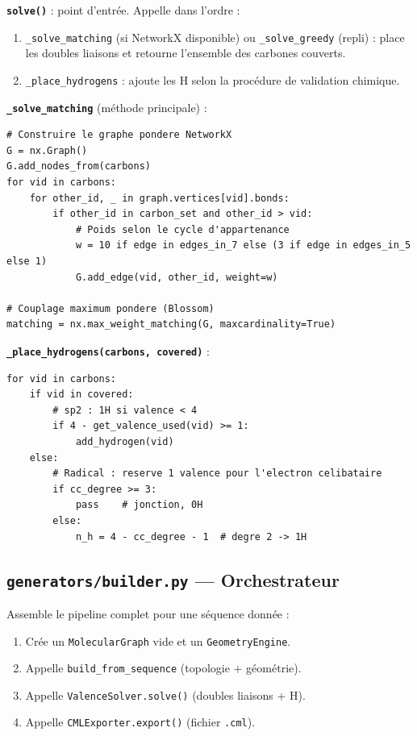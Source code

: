 \documentclass[a4paper,12pt]{article}
\begin{document}
\textbf{\texttt{solve()}} : point d'entrée. Appelle dans l'ordre :
\begin{enumerate}
  \item \texttt{\_solve\_matching} (si NetworkX disponible) ou \texttt{\_solve\_greedy} (repli) :
    place les doubles liaisons et retourne l'ensemble des carbones couverts.
  \item \texttt{\_place\_hydrogens} : ajoute les H selon la procédure de validation chimique.
\end{enumerate}

\textbf{\texttt{\_solve\_matching}} (méthode principale) :
\begin{lstlisting}
# Construire le graphe pondere NetworkX
G = nx.Graph()
G.add_nodes_from(carbons)
for vid in carbons:
    for other_id, _ in graph.vertices[vid].bonds:
        if other_id in carbon_set and other_id > vid:
            # Poids selon le cycle d'appartenance
            w = 10 if edge in edges_in_7 else (3 if edge in edges_in_5 else 1)
            G.add_edge(vid, other_id, weight=w)

# Couplage maximum pondere (Blossom)
matching = nx.max_weight_matching(G, maxcardinality=True)
\end{lstlisting}

\textbf{\texttt{\_place\_hydrogens(carbons, covered)}} :
\begin{lstlisting}
for vid in carbons:
    if vid in covered:
        # sp2 : 1H si valence < 4
        if 4 - get_valence_used(vid) >= 1:
            add_hydrogen(vid)
    else:
        # Radical : reserve 1 valence pour l'electron celibataire
        if cc_degree >= 3:
            pass    # jonction, 0H
        else:
            n_h = 4 - cc_degree - 1  # degre 2 -> 1H
\end{lstlisting}

\subsection{\texttt{generators/builder.py} — Orchestrateur}

Assemble le pipeline complet pour une séquence donnée :
\begin{enumerate}
  \item Crée un \texttt{MolecularGraph} vide et un \texttt{GeometryEngine}.
  \item Appelle \texttt{build\_from\_sequence} (topologie + géométrie).
  \item Appelle \texttt{ValenceSolver.solve()} (doubles liaisons + H).
  \item Appelle \texttt{CMLExporter.export()} (fichier \texttt{.cml}).
\end{enumerate}
\end{document}
